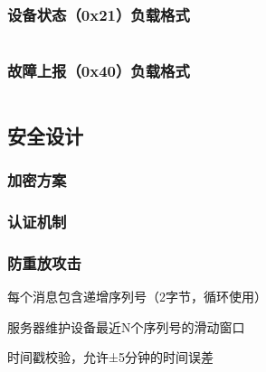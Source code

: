 \documentclass{wlwtxjsccp}
\begin{document}
\subsubsection{设备状态（0x21）负载格式}
\begin{reptable}
\begin{tabularx}{\textwidth}{|*{8}{Z|}}
\hline
{} &  &  &  &  &  &  & \\
\hline
\end{tabularx}
\end{reptable}

\subsubsection{故障上报（0x40）负载格式}
\begin{reptable}
\begin{tabularx}{\textwidth}{|*{7}{Z|}}
\hline
{} &  &  &  &  &  & \\
\hline
\end{tabularx}
\end{reptable}

\subsection{安全设计}
\subsubsection{加密方案}

\subsubsection{认证机制}

\subsubsection{防重放攻击}
\noindent 每个消息包含递增序列号（2字节，循环使用）\par
\noindent 服务器维护设备最近N个序列号的滑动窗口\par
\noindent 时间戳校验，允许±5分钟的时间误差\par
\end{document}
